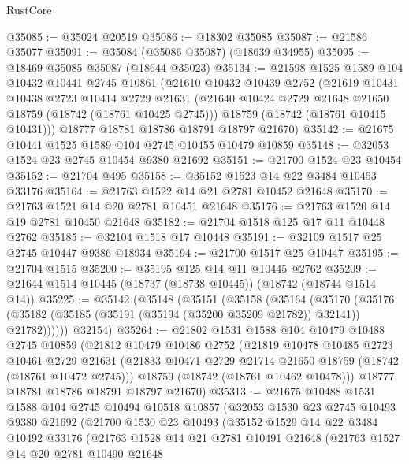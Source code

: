\begin{lexlean}{RustCore}
\begin{coremodule}
@35085 := @35024 @20519
@35086 := @18302 @35085
@35087 := @21586 @35077
@35091 := @35084 (@35086 @35087) (@18639 @34955)
@35095 := @18469 @35085 @35087 (@18644 @35023)
@35134 := @21598
    @1525
    @1589
    @104
    @10432
    @10441
    @2745
    @10861
    (@21610
      @10432
      @10439
      @2752
      (@21619
        @10431
        @10438
        @2723
        @10414
        @2729
        @21631
        (@21640 @10424 @2729 @21648 @21650 @18759 (@18742 (@18761 @10425 @2745)))
        @18759
        (@18742 (@18761 @10415 @10431)))
      @18777
      @18781
      @18786
      @18791
      @18797
      @21670)
@35142 := @21675 @10441 @1525 @1589 @104 @2745 @10455 @10479 @10859
@35148 := @32053 @1524 @23 @2745 @10454 @9380 @21692
@35151 := @21700 @1524 @23 @10454
@35152 := @21704 @495
@35158 := @35152 @1523 @14 @22 @3484 @10453 @33176
@35164 := @21763 @1522 @14 @21 @2781 @10452 @21648
@35170 := @21763 @1521 @14 @20 @2781 @10451 @21648
@35176 := @21763 @1520 @14 @19 @2781 @10450 @21648
@35182 := @21704 @1518 @125 @17 @11 @10448 @2762
@35185 := @32104 @1518 @17 @10448
@35191 := @32109 @1517 @25 @2745 @10447 @9386 @18934
@35194 := @21700 @1517 @25 @10447
@35195 := @21704 @1515
@35200 := @35195 @125 @14 @11 @10445 @2762
@35209 := @21644 @1514 @10445 (@18737 (@18738 @10445)) (@18742 (@18744 @1514 @14))
@35225 := @35142
    (@35148
      (@35151
        (@35158
          (@35164
            (@35170
              (@35176 (@35182 (@35185 (@35191 (@35194 (@35200 @35209 @21782)) @32141)) @21782))))))
      @32154)
@35264 := @21802
    @1531
    @1588
    @104
    @10479
    @10488
    @2745
    @10859
    (@21812
      @10479
      @10486
      @2752
      (@21819
        @10478
        @10485
        @2723
        @10461
        @2729
        @21631
        (@21833 @10471 @2729 @21714 @21650 @18759 (@18742 (@18761 @10472 @2745)))
        @18759
        (@18742 (@18761 @10462 @10478)))
      @18777
      @18781
      @18786
      @18791
      @18797
      @21670)
@35313 := @21675
    @10488
    @1531
    @1588
    @104
    @2745
    @10494
    @10518
    @10857
    (@32053
      @1530
      @23
      @2745
      @10493
      @9380
      @21692
      (@21700
        @1530
        @23
        @10493
        (@35152
          @1529
          @14
          @22
          @3484
          @10492
          @33176
          (@21763
            @1528
            @14
            @21
            @2781
            @10491
            @21648
            (@21763
              @1527
              @14
              @20
              @2781
              @10490
              @21648

\end{coremodule}
\end{lexlean}
